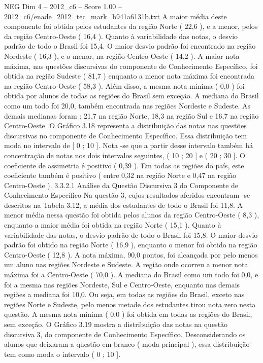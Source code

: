 \begin{textsample}{NEG Dim 4 – 2012\_c6 – Score 1.00 – 2012\_c6/enade\_2012\_tec\_mark\_b941a6131b.txt}
A maior média deste componente foi obtida pelos estudantes da região Norte ( 22,6 ), e a menor, pelos da região Centro-Oeste ( 16,4 ).
Quanto à variabilidade das notas, o desvio padrão de todo o Brasil foi 15,4.
O maior desvio padrão foi encontrado na região Nordeste ( 16,3 ), e o menor, na região Centro-Oeste ( 14,2 ).
A maior nota máxima, nas questões discursivas do componente de Conhecimento Específico, foi obtida na região Sudeste ( 81,7 ) enquanto a menor nota máxima foi encontrada na região Centro-Oeste ( 58,3 ).
Além disso, a mesma nota mínima ( 0,0 ) foi obtida por alunos de todas as regiões do Brasil sem exceção.
A mediana do Brasil como um todo foi 20,0, também encontrada nas regiões Nordeste e Sudeste.
As demais medianas foram : 21,7 na região Norte, 18,3 na região Sul e 16,7 na região Centro-Oeste.
O Gráfico 3.18 representa a distribuição das notas nas questões discursivas no componente de Conhecimento Específico.
Essa distribuição tem moda no intervalo de [ 0 ; 10 ].
Nota -se que a partir desse intervalo também há concentração de notas nos dois intervalos seguintes, ( 10 ; 20 ] e ( 20 ; 30 ].
O coeficiente de assimetria é positivo ( 0,39 ).
Em todas as regiões do país, este coeficiente também é positivo ( entre 0,32 na região Norte e 0,47 na região Centro-Oeste ). 3.3.2.1 Análise da Questão Discursiva 3 do Componente de Conhecimento Específico Na questão 3, cujos resultados aferidos encontram -se descritos na Tabela 3.12, a média dos estudantes de todo o Brasil foi 11,8.
A menor média nessa questão foi obtida pelos alunos da região Centro-Oeste ( 8,3 ), enquanto a maior média foi obtida na região Norte ( 15,1 ).
Quanto à variabilidade das notas, o desvio padrão de todo o Brasil foi 15,8.
O maior desvio padrão foi obtido na região Norte ( 16,9 ), enquanto o menor foi obtido na região Centro-Oeste ( 12,8 ).
A nota máxima, 90,0 pontos, foi alcançada por pelo menos um aluno nas regiões Nordeste e Sudeste.
A região onde ocorreu a menor nota máxima foi a Centro-Oeste ( 70,0 ).
A mediana do Brasil como um todo foi 0,0, e foi a mesma nas regiões Nordeste, Sul e Centro-Oeste, enquanto nas demais regiões a mediana foi 10,0.
Ou seja, em todas as regiões do Brasil, exceto nas regiões Norte e Sudeste, pelo menos metade dos estudantes tirou nota zero nesta questão.
A mesma nota mínima ( 0,0 ) foi obtida em todas as regiões do Brasil, sem exceção.
O Gráfico 3.19 mostra a distribuição das notas na questão discursiva 3, do componente de Conhecimento Específico.
Desconsiderando os alunos que deixaram a questão em branco ( moda principal ), essa distribuição tem como moda o intervalo ( 0 ; 10 ].

\end{textsample}

